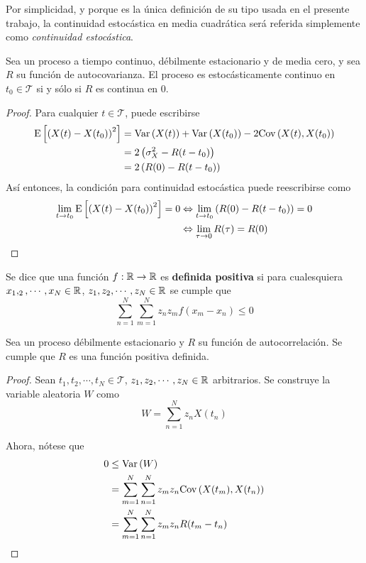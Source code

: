 Por simplicidad, y porque es la única definición de su tipo usada en el presente trabajo, la continuidad estocástica en media cuadrática será referida simplemente como \textit{continuidad estocástica}.

\begin{proposicion}
Sea \xt un proceso a tiempo continuo, débilmente estacionario y de media cero, y sea $R$ su función de autocovarianza. El proceso es estocásticamente continuo en $t_0\in \mathcal{T}$ si y sólo si $R$ es continua en $0$.
\end{proposicion}

\begin{proof}
Para cualquier $t\in \mathcal{T}$, puede escribirse
\begin{align*}
\mathrm{E}\left[ \left( X(t) - X(t_0) \right)^{2} \right] &= \mathrm{Var}\left( X(t) \right) + \mathrm{Var}\left( X(t_0) \right) - 2 \mathrm{Cov}\left( X(t),X(t_0) \right) \\
&= 2 \left( \sigma_X^{2} - R(t-t_0) \right) \\
&= 2 \left( R(0) - R(t-t_0) \right)
\end{align*}
Así entonces, la condición para continuidad estocástica puede reescribirse como
\begin{align*}
\lim_{t \rightarrow t_0} \mathrm{E}\left[ \left( X(t) - X(t_0) \right)^{2} \right] = 0 
&\Leftrightarrow
\lim_{t \rightarrow t_0} \left( R(0) - R(t-t_0) \right) = 0 \\
&\Leftrightarrow
\lim_{\tau \rightarrow 0} R(\tau) = R(0)
\end{align*}
\end{proof}

\begin{definicion}
Se dice que una función $f: \mathbb{R}\rightarrow \mathbb{R}$ es \textbf{definida positiva} si para cualesquiera $x_1, _2, \cdots, x_N \in \mathbb{R}$, $z_1, z_2, \cdots, z_N \in \mathbb{R}$ se cumple que 
\begin{equation}
\sum_{n=1}^{N} \sum_{m=1}^{N} z_n z_m f(x_m-x_n) \leq 0
\end{equation}
\end{definicion}

\begin{proposicion}
Sea \xt un proceso débilmente estacionario y $R$ su función de autocorrelación. Se cumple que $R$ es una función positiva definida.
\end{proposicion}

\begin{proof}
Sean $t_1, t_2, \cdots, t_N \in \mathcal{T}$, $z_1, z_2, \cdots, z_N \in \mathbb{R}$ arbitrarios. Se construye la variable aleatoria $W$ como
\begin{equation}
W = \sum_{n=1}^{N} z_n X(t_n)
\end{equation}

Ahora, nótese que
\begin{align*}
0 &\leq \mathrm{Var}\left( W \right) \\
&= \sum_{m=1}^{N} \sum_{n=1}^{N} z_m z_n \mathrm{Cov}\left( X(t_m),X(t_n) \right) \\
&= \sum_{m=1}^{N} \sum_{n=1}^{N} z_m z_n R(t_m-t_n)
\end{align*}
\end{proof}

